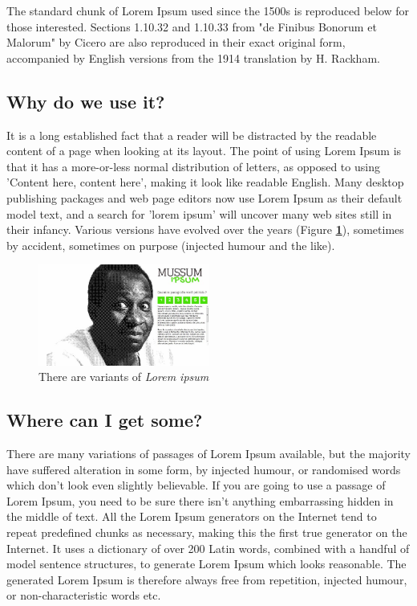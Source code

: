 \documentclass[12pt]{article}
\newcommand{\visible}[1]{\textbf{\textcolor{blue}{#1}}} %
\begin{document}
\begin{multicols}{2}
The standard chunk of Lorem Ipsum used since the 1500s is reproduced below for those interested. Sections 1.10.32 and 1.10.33 from "de Finibus Bonorum et Malorum" by Cicero are also reproduced in their exact original form, accompanied by English versions from the 1914 translation by H. Rackham.

\subsection*{%
Why do we use it?%
}

It is a long established fact that a reader will be distracted by the readable content of a page when looking at its layout. The point of using Lorem Ipsum is that it has a more-or-less normal distribution of letters, as opposed to using 'Content here, content here', making it look like readable English. Many desktop publishing packages and web page editors now use Lorem Ipsum as their default model text, and a search for 'lorem ipsum' will uncover many web sites still in their infancy. Various versions have evolved over the years (Figure \visible{\ref{fig:mussum}}), sometimes by accident, sometimes on purpose (injected humour and the like).

\end{multicols}

\begin{figure}
    \includegraphics[width=0.5\textwidth]{mussum}
    \setlength{\abovecaptionskip}{1pt}
    \caption{There are variants of \textit{Lorem ipsum}\centering}
    \label{fig:mussum}
\end{figure}


\subsection*{Where can I get some?}
There are many variations of passages of Lorem Ipsum available, but the majority have suffered alteration in some form, by injected humour, or randomised words which don't look even slightly believable. If you are going to use a passage of Lorem Ipsum, you need to be sure there isn't anything embarrassing hidden in the middle of text. All the Lorem Ipsum generators on the Internet tend to repeat predefined chunks as necessary, making this the first true generator on the Internet. It uses a dictionary of over 200 Latin words, combined with a handful of model sentence structures, to generate Lorem Ipsum which looks reasonable. The generated Lorem Ipsum is therefore always free from repetition, injected humour, or non-characteristic words etc.
\end{document}
